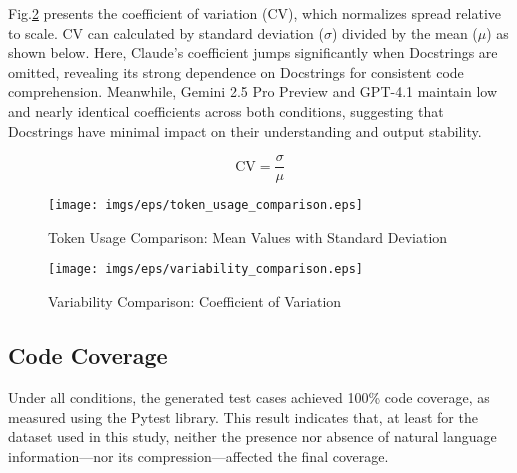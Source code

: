 Fig.\ref{fig:variablity_comparison} presents the coefficient of variation (CV), which normalizes spread relative to scale. CV can calculated by standard deviation ($\sigma$) divided by the mean ($\mu$) as shown below. Here, Claude’s coefficient jumps significantly when Docstrings are omitted, revealing its strong dependence on Docstrings for consistent code comprehension. Meanwhile, Gemini 2.5 Pro Preview and GPT-4.1 maintain low and nearly identical coefficients across both conditions, suggesting that Docstrings have minimal impact on their understanding and output stability.

\[
\mathrm{CV} = \frac{\sigma}{\mu}
\]



\begin{figure}[htbp]
    \centering
    \texttt{[image: imgs/eps/token\_usage\_comparison.eps]}
    \caption{Token Usage Comparison: Mean Values with Standard Deviation}
    \label{fig:token_usage_comparison}
\end{figure}



\begin{figure}[htbp]
    \centering
    \texttt{[image: imgs/eps/variability\_comparison.eps]}
    \caption{Variability Comparison: Coefficient of Variation}
    \label{fig:variablity_comparison}
\end{figure}



\subsection{Code Coverage}
Under all conditions, the generated test cases achieved 100\% code coverage, as measured using the Pytest library. This result indicates that, at least for the dataset used in this study, neither the presence nor absence of natural language information—nor its compression—affected the final coverage.
